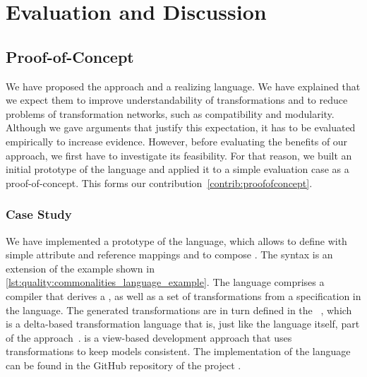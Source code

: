 \chapter{Evaluation and Discussion 
}
\label{chap:commonalities_evaluation}

\section{Proof-of-Concept}

We have proposed the \commonalities approach and a realizing language.
We have explained that we expect them to improve understandability of transformations and to reduce problems of transformation networks, such as compatibility and modularity.
Although we gave arguments that justify this expectation, it has to be evaluated empirically to increase evidence.
However, before evaluating the benefits of our approach, we first have to investigate its feasibility.
For that reason, we built an initial prototype of the language and applied it to a simple evaluation case as a proof-of-concept.
This forms our contribution~\ref{contrib:proofofconcept}.



\subsection{Case Study}

We have implemented a prototype of the \commonalities language, which allows to define \commonalities with simple attribute and reference mappings and to compose \commonalities.
The syntax is an extension of the example shown in \autoref{lst:quality:commonalities_language_example}.
The language comprises a compiler that derives a \conceptmetamodel, as well as a set of transformations from a specification in the language.
The generated transformations are in turn defined in the \reactionslanguage~\cite{klare2016b}, which is a delta-based transformation language that is, just like the \commonalities language itself, part of the \vitruv approach~\cite{kramer2013b}.
\vitruv is a view-based development approach that uses transformations to keep models consistent.
The implementation of the \commonalities language can be found in the GitHub repository of the \vitruv project \cite{vitruvFrameworkGithub}. %

